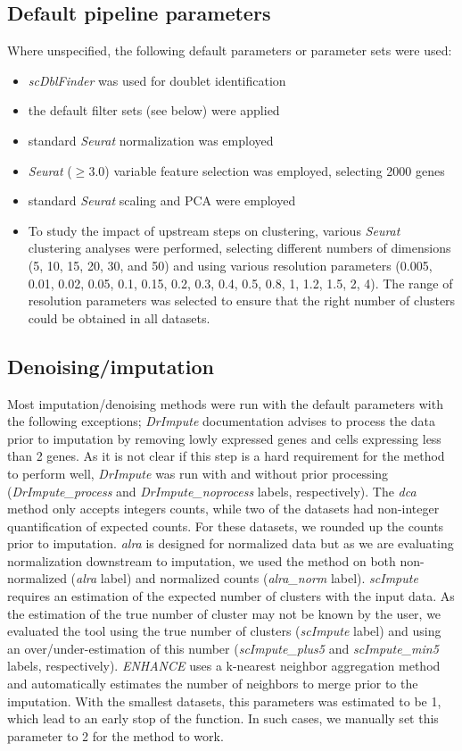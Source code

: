 \documentclass[11pt]{article}
\begin{document}
\subsection*{Default pipeline parameters}

Where unspecified, the following default parameters or parameter sets were used:
\begin{itemize}
    \item \textit{scDblFinder} was used for doublet identification
    \item the default filter sets (see below) were applied
    \item standard \textit{Seurat} normalization was employed
    \item \textit{Seurat} ($\geq$3.0) variable feature selection was employed, selecting 2000 genes
    \item standard \textit{Seurat} scaling and PCA were employed
    \item To study the impact of upstream steps on clustering, various \textit{Seurat} clustering analyses were performed, selecting different numbers of dimensions (5, 10, 15, 20, 30, and 50) and using various resolution parameters (0.005, 0.01, 0.02, 0.05, 0.1, 0.15, 0.2, 0.3, 0.4, 0.5, 0.8, 1, 1.2, 1.5, 2, 4). The range of resolution parameters was selected to ensure that the right number of clusters could be obtained in all datasets.
\end{itemize}

\subsection*{Denoising/imputation}
Most imputation/denoising methods were run with the default parameters with the following exceptions; \textit{DrImpute} documentation advises to process the data prior to imputation by removing lowly expressed genes and cells expressing less than 2 genes. As it is not clear if this step is a hard requirement for the method to perform well, \textit{DrImpute} was run with and without prior processing (\textit{DrImpute\_process} and \textit{DrImpute\_noprocess} labels, respectively). The \textit{dca} method only accepts integers counts, while two of the datasets had non-integer quantification of expected counts. For these datasets, we rounded up the counts prior to imputation. \textit{alra} is designed for normalized data but as we are evaluating normalization downstream to imputation, we used the method on both non-normalized (\textit{alra} label) and normalized counts (\textit{alra\_norm} label). \textit{scImpute} requires an estimation of the expected number of clusters with the input data. As the estimation of the true number of cluster may not be known by the user, we evaluated the tool using the true number of clusters (\textit{scImpute} label) and using an over/under-estimation of this number (\textit{scImpute\_plus5} and \textit{scImpute\_min5} labels, respectively). \textit{ENHANCE} uses a k-nearest neighbor aggregation method and automatically estimates the number of neighbors to merge prior to the imputation. With the smallest datasets, this parameters was estimated to be 1, which lead to an early stop of the function. In such cases, we manually set this parameter to 2 for the method to work. 
\end{document}
